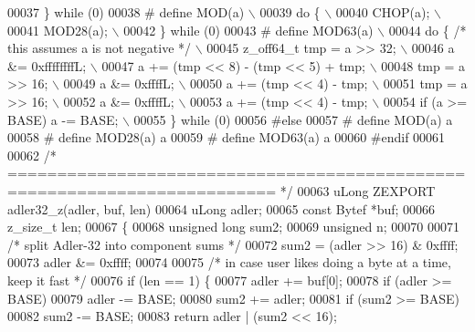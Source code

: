 \begin{DoxyCode}
{00037 \textcolor{preprocessor}{    \} while (0)}
00038 \textcolor{preprocessor}{#  define MOD(a) \(\backslash\)}
00039 \textcolor{preprocessor}{    do \{ \(\backslash\)}
00040 \textcolor{preprocessor}{        CHOP(a); \(\backslash\)}
00041 \textcolor{preprocessor}{        MOD28(a); \(\backslash\)}
00042 \textcolor{preprocessor}{    \} while (0)}
00043 \textcolor{preprocessor}{#  define MOD63(a) \(\backslash\)}
00044 \textcolor{preprocessor}{    do \{ }\textcolor{comment}{/* this assumes a is not negative */}\textcolor{preprocessor}{ \(\backslash\)}
00045 \textcolor{preprocessor}{        z\_off64\_t tmp = a >> 32; \(\backslash\)}
00046 \textcolor{preprocessor}{        a &= 0xffffffffL; \(\backslash\)}
00047 \textcolor{preprocessor}{        a += (tmp << 8) - (tmp << 5) + tmp; \(\backslash\)}
00048 \textcolor{preprocessor}{        tmp = a >> 16; \(\backslash\)}
00049 \textcolor{preprocessor}{        a &= 0xffffL; \(\backslash\)}
00050 \textcolor{preprocessor}{        a += (tmp << 4) - tmp; \(\backslash\)}
00051 \textcolor{preprocessor}{        tmp = a >> 16; \(\backslash\)}
00052 \textcolor{preprocessor}{        a &= 0xffffL; \(\backslash\)}
00053 \textcolor{preprocessor}{        a += (tmp << 4) - tmp; \(\backslash\)}
00054 \textcolor{preprocessor}{        if (a >= BASE) a -= BASE; \(\backslash\)}
00055 \textcolor{preprocessor}{    \} while (0)}
00056 \textcolor{preprocessor}{#else}
00057 \textcolor{preprocessor}{#  define MOD(a) a %
00058 \textcolor{preprocessor}{#  define MOD28(a) a %
00059 \textcolor{preprocessor}{#  define MOD63(a) a %
00060 \textcolor{preprocessor}{#endif}
00061 
00062 \textcolor{comment}{/* ========================================================================= */}
00063 uLong ZEXPORT adler32\_z(adler, buf, len)
00064     uLong adler;
00065     \textcolor{keyword}{const} Bytef *buf;
00066     z\_size\_t len;
00067 \{
00068     \textcolor{keywordtype}{unsigned} \textcolor{keywordtype}{long} sum2;
00069     \textcolor{keywordtype}{unsigned} n;
00070 
00071     \textcolor{comment}{/* split Adler-32 into component sums */}
00072     sum2 = (adler >> 16) & 0xffff;
00073     adler &= 0xffff;
00074 
00075     \textcolor{comment}{/* in case user likes doing a byte at a time, keep it fast */}
00076     \textcolor{keywordflow}{if} (len == 1) \{
00077         adler += buf[0];
00078         \textcolor{keywordflow}{if} (adler >= BASE)
00079             adler -= BASE;
00080         sum2 += adler;
00081         \textcolor{keywordflow}{if} (sum2 >= BASE)
00082             sum2 -= BASE;
00083         \textcolor{keywordflow}{return} adler | (sum2 << 16);
}}}}
\end{DoxyCode}
